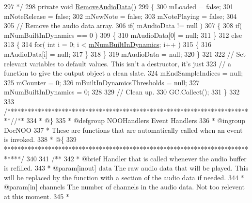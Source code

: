 \begin{DoxyCodeInclude}
297 \textcolor{comment}{    */}
298     \textcolor{keyword}{private} \textcolor{keywordtype}{void} \hyperlink{group___n_o_o_priv_func_ga12f593bb5de83dc548eff4617fc687b5}{RemoveAudioData}()
299     \{
300         mLoaded = \textcolor{keyword}{false};
301         mNoteRelease = \textcolor{keyword}{false};
302         mNewNote = \textcolor{keyword}{false};
303         mNotePlaying = \textcolor{keyword}{false};
304 
305         \textcolor{comment}{// Remove the audio data array.}
306         \textcolor{keywordflow}{if}( mAudioData != null )
307         \{
308             \textcolor{keywordflow}{if}( mNumBuiltInDynamics == 0 )
309             \{
310                 mAudioData[0] = null;
311             \}
312             \textcolor{keywordflow}{else}
313             \{
314                 \textcolor{keywordflow}{for}( \textcolor{keywordtype}{int} i = 0; i < \hyperlink{group___n_o_o_priv_var_ga3cc04564fcc1b1c4597af18e7e4fbc47}{mNumBuiltInDynamics}; i++ )
315                 \{
316                     mAudioData[i] = null;
317                 \}
318             \}
319             mAudioData = null;
320         \}
321 
322         \textcolor{comment}{// Set relevant variables to default values. This isn't a destructor, it's just}
323         \textcolor{comment}{// a function to give the output object a clean slate. }
324         mEndSampleIndices = null;
325         mCounter = 0;
326         mBuiltInDynamicsThresholds = null;
327         mNumBuiltInDynamics = 0;
328 
329         \textcolor{comment}{// Clean up.}
330         GC.Collect();
331     \}
332 
333     \textcolor{comment}{/*************************************************************************/}\textcolor{comment}{/** }
334 \textcolor{comment}{    * @\}}
335 \textcolor{comment}{    * @defgroup NOOHandlers Event Handlers}
336 \textcolor{comment}{    * @ingroup DocNOO}
337 \textcolor{comment}{    * These are functions that are automatically called when an event is invoked.}
338 \textcolor{comment}{    * @\{}
339 \textcolor{comment}{    *****************************************************************************/}
340 \textcolor{comment}{}
341 \textcolor{comment}{    /**}
342 \textcolor{comment}{     * @brief Handler that is called whenever the audio buffer is refilled. }
343 \textcolor{comment}{     * @param[inout] data The raw audio data that will be played. This will be replaced by the function
       with a section of the audio data if needed. }
344 \textcolor{comment}{     * @param[in] channels The number of channels in the audio data. Not too relevent at this moment.}
345 \textcolor{comment}{     * }

\end{DoxyCodeInclude}
